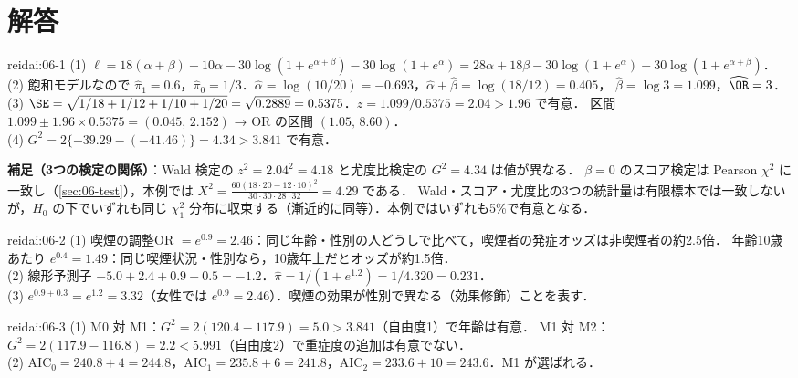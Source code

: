 \section{解答}\label{sec:06-sol}
\begin{kaitou}{reidai:06-1}
(1) $\ell=18(\alpha+\beta)+10\alpha-30\log(1+e^{\alpha+\beta})-30\log(1+e^\alpha)=28\alpha+18\beta-30\log(1+e^\alpha)-30\log(1+e^{\alpha+\beta})$．\\
(2) 飽和モデルなので $\hat\pi_1=0.6$，$\hat\pi_0=1/3$．$\hat\alpha=\log(10/20)=-0.693$，$\hat\alpha+\hat\beta=\log(18/12)=0.405$，
$\hat\beta=\log3=1.099$，$\widehat{\OR}=3$．\\
(3) $\SE=\sqrt{1/18+1/12+1/10+1/20}=\sqrt{0.2889}=0.5375$．$z=1.099/0.5375=2.04>1.96$ で有意．
区間 $1.099\pm1.96\times0.5375=(0.045,\,2.152)$ → OR の区間 $(1.05,\,8.60)$．\\
(4) $G^2=2\{-39.29-(-41.46)\}=4.34>3.841$ で有意．

\textbf{補足（3つの検定の関係）}：Wald 検定の $z^2=2.04^2=4.18$ と尤度比検定の $G^2=4.34$ は値が異なる．
$\beta=0$ のスコア検定は Pearson $\chi^2$ に一致し（\cref{sec:06-test}），本例では $X^2=\frac{60(18\cdot20-12\cdot10)^2}{30\cdot30\cdot28\cdot32}=4.29$ である．
Wald・スコア・尤度比の3つの統計量は有限標本では一致しないが，$H_0$ の下でいずれも同じ $\chi^2_1$ 分布に収束する（漸近的に同等）．本例ではいずれも5\%で有意となる．
\end{kaitou}

\begin{kaitou}{reidai:06-2}
(1) 喫煙の調整OR $=e^{0.9}=2.46$：同じ年齢・性別の人どうしで比べて，喫煙者の発症オッズは非喫煙者の約2.5倍．
年齢10歳あたり $e^{0.4}=1.49$：同じ喫煙状況・性別なら，10歳年上だとオッズが約1.5倍．\\
(2) 線形予測子 $-5.0+2.4+0.9+0.5=-1.2$．$\hat\pi=1/(1+e^{1.2})=1/4.320=0.231$．\\
(3) $e^{0.9+0.3}=e^{1.2}=3.32$（女性では $e^{0.9}=2.46$）．喫煙の効果が性別で異なる（効果修飾）ことを表す．
\end{kaitou}

\begin{kaitou}{reidai:06-3}
(1) M0 対 M1：$G^2=2(120.4-117.9)=5.0>3.841$（自由度1）で年齢は有意．
M1 対 M2：$G^2=2(117.9-116.8)=2.2<5.991$（自由度2）で重症度の追加は有意でない．\\
(2) $\mathrm{AIC}_0=240.8+4=244.8$，$\mathrm{AIC}_1=235.8+6=241.8$，$\mathrm{AIC}_2=233.6+10=243.6$．M1 が選ばれる．
\end{kaitou}

